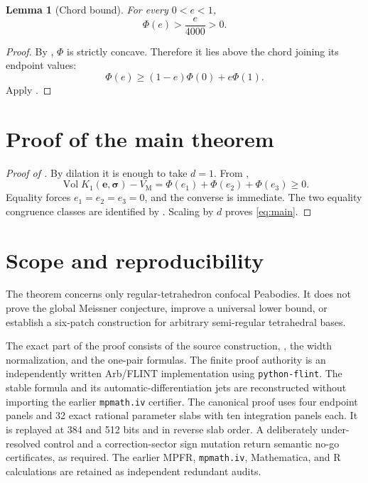 \documentclass[11pt]{article}
\numberwithin{equation}{section}
\newtheorem{lemma}[theorem]{Lemma}
\theoremstyle{remark}
\newcommand{\Vol}{\operatorname{Vol}}
\newcommand{\VM}{V_{\mathrm M}}
\begin{document}
\begin{lemma}[Chord bound]
\label{lem:chord}
For every \(0<e<1\),
\begin{equation}
  \Phi(e)>\frac e{4000}>0.
  \label{eq:chord-bound}
\end{equation}
\end{lemma}

\begin{proof}
By , \(\Phi\) is strictly concave.  Therefore it lies above the chord joining its endpoint values:
\[
  \Phi(e)\ge(1-e)\Phi(0)+e\Phi(1).
\]
Apply .
\end{proof}

\section{Proof of the main theorem}

\begin{proof}[Proof of ]
By dilation it is enough to take \(d=1\).  From ,
\[
  \Vol K_1(\mathbf e,\boldsymbol\sigma)-\VM
  =\Phi(e_1)+\Phi(e_2)+\Phi(e_3)\ge0.
\]
Equality forces \(e_1=e_2=e_3=0\), and the converse is immediate.  The two equality congruence classes are identified by .  Scaling by \(d\) proves \eqref{eq:main}.
\end{proof}

\section{Scope and reproducibility}

The theorem concerns only regular-tetrahedron confocal Peabodies.  It does not prove the global Meissner conjecture, improve a universal lower bound, or establish a six-patch construction for arbitrary semi-regular tetrahedral bases.

The exact part of the proof consists of the source construction, , the width normalization, and the one-pair formulas.  The finite proof authority is an independently written Arb/FLINT implementation using \texttt{python-flint}.  The stable formula and its automatic-differentiation jets are reconstructed without importing the earlier \texttt{mpmath.iv} certifier.  The canonical proof uses four endpoint panels and 32 exact rational parameter slabs with ten integration panels each.  It is replayed at 384 and 512 bits and in reverse slab order.  A deliberately under-resolved control and a correction-sector sign mutation return semantic no-go certificates, as required.  The earlier MPFR, \texttt{mpmath.iv}, Mathematica, and R calculations are retained as independent redundant audits.
\end{document}
